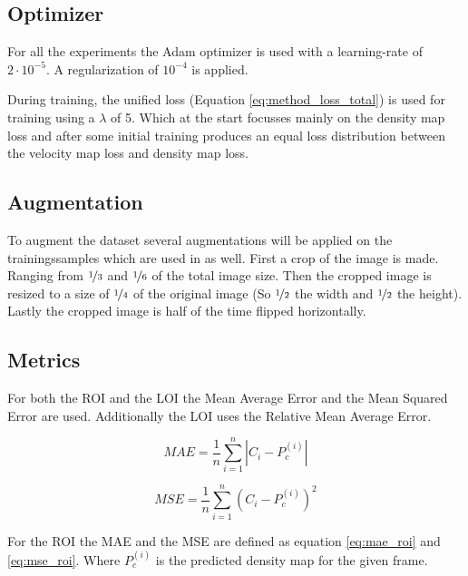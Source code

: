 \subsection{Optimizer}
For all the experiments the Adam optimizer \cite{Kingma2015} is used with a learning-rate of $2\cdot 10^{-5}$. A regularization of $10^{-4}$ is applied.

During training, the unified loss (Equation \ref{eq:method_loss_total}) is used for training using a $\lambda$ of 5. Which at the start focusses mainly on the density map loss and after some initial training produces an equal loss distribution between the velocity map loss and density map loss.

\subsection{Augmentation}
To augment the dataset several augmentations will be applied on the trainingssamples which are used in \cite{li2018csrnet} as well. First a crop of the image is made. Ranging from $\nicefrac{1}{3}$ and $\nicefrac{1}{6}$ of the total image size. Then the cropped image is resized to a size of $\nicefrac{1}{4}$ of the original image (So $\nicefrac{1}{2}$ the width and $\nicefrac{1}{2}$ the height). Lastly the cropped image is half of the time flipped horizontally.

\subsection{Metrics}
For both the ROI and the LOI the Mean Average Error and the Mean Squared Error are used. Additionally the LOI uses the Relative Mean Average Error.

\begin{equation}
\label{eq:mae_roi}
	MAE = \frac{1}{n}\sum^n_{i=1}|C_i-P_c^{(i)}|
\end{equation}

\begin{equation}
\label{eq:mse_roi}
	MSE = \frac{1}{n}\sum^n_{i=1}(C_i-P_c^{(i)})^2
\end{equation}

For the ROI the MAE and the MSE are defined as equation \ref{eq:mae_roi} and \ref{eq:mse_roi}. Where $P_c^{(i)}$ is the predicted density map for the given frame.

